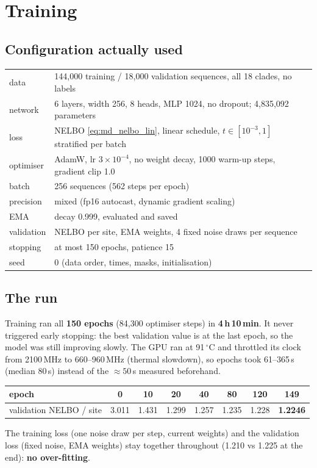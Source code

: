 \section{Training}\label{sec:md_training}
\subsection{Configuration actually used}
\begin{center}\small
\begin{tabular}{ll}
\toprule
data & 144{,}000 training / 18{,}000 validation sequences, all 18 clades, no labels\\
network & 6 layers, width 256, 8 heads, MLP 1024, no dropout; 4{,}835{,}092 parameters\\
loss & NELBO \eqref{eq:md_nelbo_lin}, linear schedule, $t\in[10^{-3},1]$ stratified per batch\\
optimiser & AdamW, lr $3\times10^{-4}$, no weight decay, 1000 warm-up steps, gradient clip 1.0\\
batch & 256 sequences (562 steps per epoch)\\
precision & mixed (fp16 autocast, dynamic gradient scaling)\\
EMA & decay 0.999, evaluated and saved\\
validation & NELBO per site, EMA weights, 4 fixed noise draws per sequence\\
stopping & at most 150 epochs, patience 15\\
seed & 0 (data order, times, masks, initialisation)\\
\bottomrule
\end{tabular}
\end{center}

\subsection{The run}
Training ran all \textbf{150 epochs} (84{,}300 optimiser steps) in \textbf{4\,h\,10\,min}. It never triggered early stopping:
the best validation value is at the last epoch, so the model was still improving slowly. The GPU ran at 91\,$^\circ$C and
throttled its clock from 2100\,MHz to 660--960\,MHz (thermal slowdown), so epochs took 61--365\,s (median 80\,s)
instead of the $\approx50$\,s measured beforehand.
\begin{center}\small
\begin{tabular}{lccccccc}
\toprule
epoch & 0 & 10 & 20 & 40 & 80 & 120 & 149\\
\midrule
validation NELBO / site & 3.011 & 1.431 & 1.299 & 1.257 & 1.235 & 1.228 & \textbf{1.2246}\\
\bottomrule
\end{tabular}
\end{center}
The training loss (one noise draw per step, current weights) and the validation loss (fixed noise, EMA weights)
stay together throughout (1.210 vs 1.225 at the end): \textbf{no over-fitting}.

